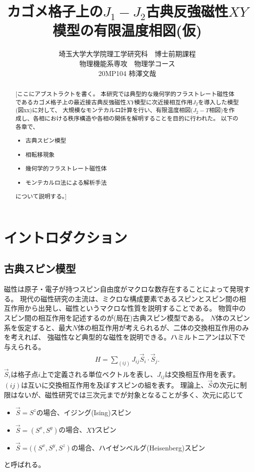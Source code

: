 \documentclass[12pt,titlepage,dvipdfmx]{jarticle}
\title{カゴメ格子上の$J_1 - J_2$古典反強磁性$XY$模型の有限温度相図(仮)}
\author{埼玉大学大学院理工学研究科　博士前期課程\\物理機能系専攻　物理学コース\\20MP104 柿澤文哉 }
\begin{document}
\maketitle

\newpage

\begin{abstract}
[ここにアブストラクトを書く。
本研究では典型的な幾何学的フラストレート磁性体であるカゴメ格子上の最近接古典反強磁性$XY$模型に次近接相互作用$J_2$を導入した模型(図xx)に対して、
大規模なモンテカルロ計算を行い、有限温度相図($J_2-T$相図)を作成し、各相における秩序構造や各相の関係を解明することを目的に行われた。
以下の各章で、
\begin{itemize}
   \item 古典スピン模型
   \item 相転移現象
   \item 幾何学的フラストレート磁性体
   \item モンテカルロ法による解析手法
\end{itemize}
について説明する。]


\end{abstract}

\tableofcontents

\newpage

\newpage 

\section{イントロダクション}
\subsection{{古典スピン模型}}
磁性は原子・電子が持つスピン自由度がマクロな数存在することによって発現する。
現代の磁性研究の主流は、ミクロな構成要素であるスピンとスピン間の相互作用から出発し、磁性というマクロな性質を説明することである。
物質中のスピン間の相互作用を記述するのが(局在)古典スピン模型である。
$N$体のスピン系を仮定すると、最大$N$体の相互作用が考えられるが、二体の交換相互作用のみを考えれば、
強磁性など典型的な磁性を説明できる。ハミルトニアンは以下で与えられる。
\begin{align}
   H = \sum_{(ij)} J_{ij} \vec{S}_i\cdot \vec{S}_j.
\end{align}
$\vec{S}_i$は格子点$i$上で定義される単位ベクトルを表し、$J_{ij}$は交換相互作用を表す。
$(ij)$は互いに交換相互作用を及ぼすスピンの組を表す。
理論上、$\vec{S}$の次元に制限はないが、磁性研究では三次元までが対象となることが多く、次元に応じて
\begin{itemize}
   \item $\vec{S}=S^z$の場合、イジング(Ising)スピン
   \item $\vec{S}=(S^x,S^y)$の場合、$XY$スピン
   \item $\vec{S}=((S^x,S^y,S^z)$の場合、ハイゼンベルグ(Heisenberg)スピン
\end{itemize}
と呼ばれる。
\end{document}
